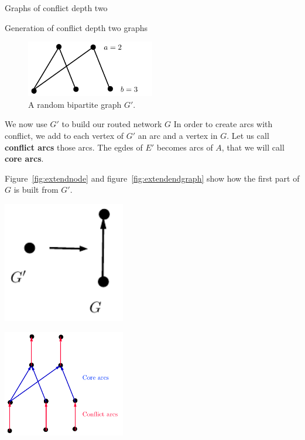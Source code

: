 \documentclass[10pt]{article}
\begin{document}
\begin{section}{Graphs of conflict depth two}
\begin{subsection}{Generation of conflict depth two graphs}
\begin{figure}[h]
\begin{center}
\includegraphics[width=0.5\textwidth]{random23}
\caption{A random bipartite graph $G'$.}\label{fig:random23}
\end{center}
\end{figure}


We now use $G'$ to build our routed network $G$
In order to create arcs with conflict, we add to each vertex of $G'$ an arc and a vertex in $G$. Let us call \textbf{conflict arcs} those arcs. The egdes of $E'$ becomes arcs of $A$, that we will call \textbf{core arcs}.

Figure~\ref{fig:extendnode} and figure~\ref{fig:extendendgraph} show how the first part of $G$ is built from $G'$.

\begin{minipage}{.5\linewidth}

\begin{center}
\includegraphics[width=0.4\textwidth]{extendnode}
\label{fig:extendnode}
\end{center}

\end{minipage}
\begin{minipage}{.5\linewidth}

\begin{center}
\includegraphics[width=0.4\textwidth]{extendendgraph}
\label{fig:extendendgraph}
\end{center}


\end{minipage}
\end{subsection}
\end{section}
\end{document}
